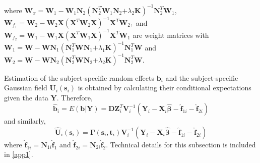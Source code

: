 \documentclass[review]{elsarticle}
\begin{document}
where 
$ \boldsymbol W_x =
 \boldsymbol W_1 
 -
\boldsymbol W_1 \boldsymbol N_2 
 (\boldsymbol N_2^T  \boldsymbol W_1 \boldsymbol N_2 \boldsymbol 
 + \lambda_2 \boldsymbol K)^{-1} 
 \boldsymbol N_2^T  \boldsymbol W_1$, 
 $\boldsymbol W_{f_1}  =  \boldsymbol W_2 - \boldsymbol W_2\boldsymbol X(\boldsymbol X^T  \boldsymbol W_2\boldsymbol X)^{-1}  \boldsymbol X^T  \boldsymbol W_2,$
 and 
 $\boldsymbol W_{f_2}  =  \boldsymbol W_1 - \boldsymbol W_1\boldsymbol X(\boldsymbol X^T  \boldsymbol W_1\boldsymbol X)^{-1}  \boldsymbol X^T  \boldsymbol W_1$ are weight matrices
 with
 $ \boldsymbol W_1 =
 \boldsymbol W 
 -
\boldsymbol W \boldsymbol N_1 
 (\boldsymbol N_1^T  \boldsymbol W \boldsymbol N_1 \boldsymbol 
 + \lambda_1 \boldsymbol K)^{-1} 
 \boldsymbol N_1^T  \boldsymbol W$
 and
 $ \boldsymbol W_2 =
 \boldsymbol W 
 -
\boldsymbol W \boldsymbol N_2 
 (\boldsymbol N_2^T  \boldsymbol W \boldsymbol N_2 \boldsymbol 
 + \lambda_2 \boldsymbol K)^{-1} 
 \boldsymbol N_2^T  \boldsymbol W$.

Estimation of the subject-specific random effects $\boldsymbol b_i$ and the subject-specific Gaussian field $\boldsymbol U_i(\boldsymbol s_i)$ is obtained by calculating their conditional expectations given the data $\boldsymbol Y$.
Therefore,
\begin{equation}\label{bHat}
\boldsymbol {\hat b}_i = E(\boldsymbol b | \boldsymbol Y)
=  \boldsymbol D \boldsymbol Z_i^T   \boldsymbol V_i^{-1} 
(\boldsymbol Y_i - \boldsymbol X_i\boldsymbol{\hat \beta} -
 \boldsymbol {\hat f}_{1i} -
\boldsymbol {\hat f}_{2i})
\end{equation}
and similarly,   
\begin{equation}\label{uHat}
\bm {\hat U}_i(\bm s_i)
=
\bm \Gamma(\bm s_i, \bm t_i) \bm V_i^{-1}
(\boldsymbol Y_i - \boldsymbol X_i\boldsymbol{\hat \beta} -
 \boldsymbol {\hat f}_{1i} -
\boldsymbol {\hat f}_{2i})
\end{equation}
where $\boldsymbol {\hat f}_{1i} =  \boldsymbol N_{1i} \boldsymbol {\hat f}_1$
and 
$\boldsymbol {\hat f}_{2i} =  \boldsymbol N_{2i} \boldsymbol {\hat f}_2$.  Technical details for this subsection is included in \ref{app1}.
\end{document}
